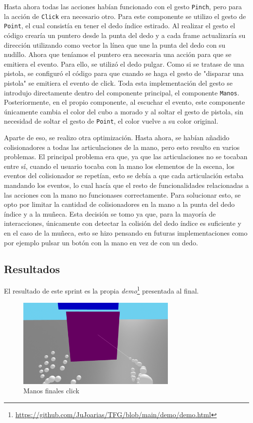 \documentclass[a4paper, 12pt]{book}
\begin{document}
Hasta ahora todas las acciones habían funcionado con el gesto \texttt{Pinch}, pero para la acción de \texttt{Click} era necesario otro. Para este componente se utilizo el gesto de \texttt{Point}, el cual consistía en tener el dedo índice estirado. Al realizar el gesto el código crearía un puntero desde la punta del dedo y a cada frame actualizaría su dirección utilizando como vector la línea que une la punta del dedo con su nudillo. 
Ahora que teníamos el puntero era necesaria una acción para que se emitiera el evento. Para ello, se utilizó el dedo pulgar. Como si se tratase de una pistola, se configuró el código para que cuando se haga el gesto de "disparar una pistola" se emitiera el evento de click. Toda esta implementación del gesto se introdujo directamente dentro del componente principal, el componente \texttt{Manos}. 
Posteriormente, en el propio componente, al escuchar el evento, este componente únicamente cambia el color del cubo a morado y al soltar el gesto de pistola, sin necesidad de soltar el gesto de \texttt{Point}, el color vuelve a su color original. 

Aparte de eso, se realizo otra optimización. Hasta ahora, se habían añadido colisionadores a todas las articulaciones de la mano, pero esto resulto en varios problemas. El principal problema era que, ya que las articulaciones no se tocaban entre sí, cuando el usuario tocaba con la mano los elementos de la escena, los eventos del colisionador se repetían, esto se debía a que cada articulación estaba mandando los eventos, lo cual hacía que el resto de funcionalidades relacionadas a las acciones con la mano no funcionases correctamente. 
Para solucionar esto, se opto por limitar la cantidad de colisionadores en la mano a la punta del dedo índice y a la muñeca. Esta decisión se tomo ya que, para la mayoría de interacciones, únicamente con detectar la colisión del dedo índice es suficiente y en el caso de la muñeca, esto se hizo pensando en futuras implementaciones como por ejemplo pulsar un botón con la mano en vez de con un dedo.

\subsection{Resultados}
\label{subsec:resultados6}
El resultado de este sprint es la propia \textit{demo}\footnote{\url{https://github.com/JuJoarias/TFG/blob/main/demo/demo.html}} presentada al final. 

\begin{figure}[H] 
  \centering
  \includegraphics[width=0.7\textwidth]{img/click.jpg} 
  \caption{Manos finales click}
  \label{fig:sprint6-1}
\end{figure}
\end{document}
